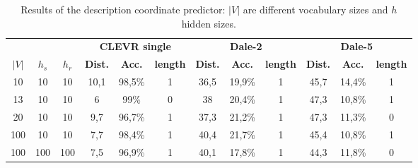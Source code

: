 \begin{table}[h]
    \centering
    \begin{tabular}{ccc|ccc|ccc|ccc}
        \toprule
              &         &         & \multicolumn{3}{c}{\textbf{CLEVR single}} & \multicolumn{3}{c}{\textbf{Dale-2}} & \multicolumn{3}{c}{\textbf{Dale-5}}                                                                                                       \\\cmidrule(lr){4-6}\cmidrule(lr){7-9}\cmidrule(lr){10-12}
        $|V|$ & $h_{s}$ & $h_{r}$ & \textbf{Dist.}                            & \textbf{Acc.}                       & \textbf{length}                     & \textbf{Dist.} & \textbf{Acc.} & \textbf{length} & \textbf{Dist.} & \textbf{Acc.} & \textbf{length} \\\midrule
        {10}  & {10}    & {10}    & {10,1}                                    & {98,5\%}                            & {1}                                 & {36,5}         & {19,9\%}      & {1}             & {45,7}         & {14,4\%}      & {1}             \\
        {13}  & {10}    & {10}    & {6}                                       & {99\%}                              & {0}                                 & {38}           & {20,4\%}      & {1}             & {47,3}         & {10,8\%}      & {1}             \\
        {20}  & {10}    & {10}    & {9,7}                                     & {96,7\%}                            & {1}                                 & {37,3}         & {21,2\%}      & {1}             & {47,3}         & {11,3\%}      & {0}             \\
        {100} & {10}    & {10}    & {7,7}                                     & {98,4\%}                            & {1}                                 & {40,4}         & {21,7\%}      & {1}             & {45,4}         & {10,8\%}      & {1}             \\
        {100} & {100}   & {100}   & {7,5}                                     & {96,9\%}                            & {1}                                 & {40,1}         & {17,8\%}      & {1}             & {44,3}         & {11,8\%}      & {0}             \\
        \bottomrule
    \end{tabular}
    \caption{Results of the description coordinate predictor: $|V|$ are different vocabulary sizes and $h$ hidden sizes.}
    \label{tab:results_dale_predictor_game}
\end{table}

